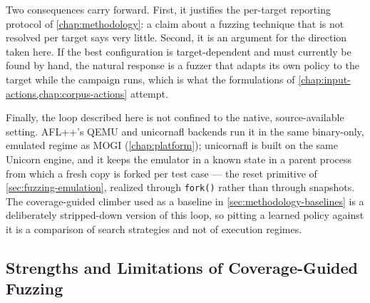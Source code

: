 Two consequences carry forward.
First, it justifies the per-target reporting protocol of \cref{chap:methodology}: a claim
about a fuzzing technique that is not resolved per target says very little.
Second, it is an argument for the direction taken here.
If the best configuration is target-dependent and must currently be found by hand, the
natural response is a fuzzer that adapts its own policy to the target while the campaign
runs, which is what the formulations of \cref{chap:input-actions,chap:corpus-actions}
attempt.

Finally, the loop described here is not confined to the native, source-available setting.
AFL++'s QEMU and unicornafl backends run it in the same binary-only, emulated regime as
MOGI (\cref{chap:platform}); unicornafl is built on the same Unicorn engine, and it keeps
the emulator in a known state in a parent process from which a fresh copy is forked per
test case --- the reset primitive of \cref{sec:fuzzing-emulation}, realized through
\texttt{fork()} rather than through snapshots.
The coverage-guided climber used as a baseline in \cref{sec:methodology-baselines} is a
deliberately stripped-down version of this loop, so pitting a learned policy against it is
a comparison of search strategies and not of execution regimes.

\subsection{Strengths and Limitations of Coverage-Guided Fuzzing}\label{sec:fuzzing-limitations}

